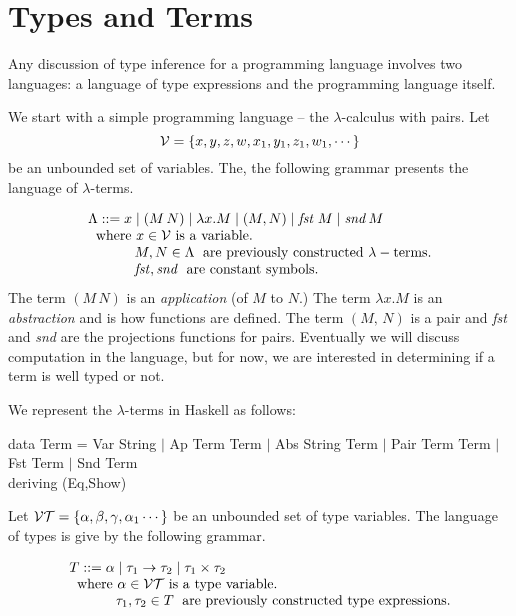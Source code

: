 \documentclass[11pt]{article}
\begin{document}

\section{Types and Terms}

Any discussion of type inference for a programming language involves
two languages: a language of type expressions and the programming
language itself.

We start with a simple programming language -- the $\lambda$-calculus with
pairs.  Let \[{\cal{V}}=\{x,y,z,w,x_1,y_1,z_1,w_1,\cdots\}\] be an unbounded
set of variables. The, the following grammar presents the language of
$\lambda$-terms.

\[\begin{array}{l}
\Lambda ::= x \mid (M\,N) \mid \lambda{}x.M \mid (M,N) \mid {\mathit{fst}}\;M \mid {\mathit{snd}} \, M \\
\;\;{\mathrm{where\ }} x\in{}{\cal{V}} {\mathrm{\ is\ a \ variable.}}\\
\;\;\;\;\;\;\;\;\;\;\;\;M,N\in\Lambda \; {\mathrm{\ are\  previously\  constructed\ \lambda-terms.}}\\
\;\;\;\;\;\;\;\;\;\;\;\;{\mathit{fst,snd}}\;{\mathrm{\ are\ constant\ symbols.}}
\end{array}
\]
The term $(M\,N)$ is an {\em{application}} (of $M$ to $N$.) The term
$\lambda{}x.M$ is an {\em{abstraction}} and is how functions are defined.  The
term $(M,\,N)$ is a pair and {\it{fst}} and {\it{snd}} are the projections
functions for pairs.  Eventually we will discuss computation in the language,
but for now, we are interested in determining if a term is well typed or not.

We represent the $\lambda$-terms in Haskell as follows:

\begin{smallprogram*}
\>data  Term =   Var String $\mid$ Ap Term Term $\mid$ Abs String Term $\mid$ Pair Term Term $\mid$ Fst Term $\mid$ Snd Term \\
\>        deriving (Eq,Show) \\
\end{smallprogram*}


Let ${\cal{VT}} = \{\alpha,\beta,\gamma,\alpha_1\cdots\}$ be an unbounded set
of type variables. The language of types is give by the following grammar.

\[\begin{array}{l}
T ::= \alpha \mid \tau_1 \rightarrow \tau_2 \mid \tau_1 \times \tau_2  \\
\;\;{\mathrm{where\ }} \alpha\in{}{\cal{VT}} {\mathrm{\ is\ a \ type\ variable.}}\\
\;\;\;\;\;\;\;\;\;\;\;\;\tau_1,\tau_2\in{}T \; {\mathrm{\ are\  previously\  constructed\ type\ expressions.}}\\
\end{array}\]
\end{document}
